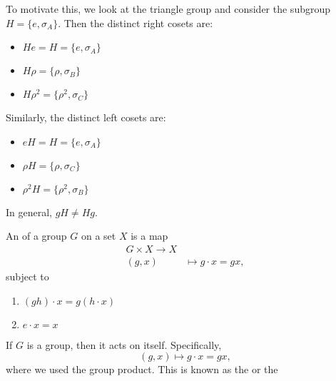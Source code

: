 \documentclass{article}
\numberwithin{equation}{section}
\begin{document}
To motivate this, we look at the triangle group and consider the subgroup $H=\{e,\sigma_A\}$. Then the distinct right cosets are:
\begin{itemize}
    \item $He=H = \{e, \sigma_A\}$
    \item $H\rho = \{\rho, \sigma_B\}$
    \item $H\rho^2 = \{\rho^2, \sigma_C\}$ 
\end{itemize}
Similarly, the distinct left cosets are:
\begin{itemize}
    \item $eH = H = \{e, \sigma_A\}$
    \item $\rho H = \{\rho, \sigma_C\}$
    \item $\rho^2 H = \{\rho^2, \sigma_B\}$
\end{itemize}
In general, $gH \neq Hg.$
\begin{definition}
    An  of a group $G$ on a set $X$ is a map
    \begin{align*}
        G \times X \rightarrow X \\ 
        (g,x) &\mapsto g\cdot x = gx,
    \end{align*}
    subject to 
    \begin{enumerate}[label=(\roman*)]
        \item $(gh)\cdot x = g(h\cdot x)$
        \item $e \cdot x = x$
    \end{enumerate}
\end{definition}
If $G$ is a group, then it acts on itself. Specifically, 
\begin{equation*}
    (g,x) \mapsto g \cdot x = gx,
\end{equation*}
where we used the group product. This is known as the  or the 
\end{document}
